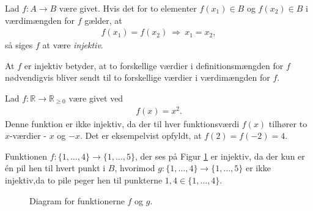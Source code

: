 \begin{defn}
	Lad $f:A \to B$ være givet. Hvis det for to elementer $f(x_1)\in B$ og $f(x_2)\in B$ i 		    værdimængden for $f$ gælder, at
	\begin{align*}
		f(x_1) = f(x_2) \ \Rightarrow \ x_1 = x_2,
	\end{align*}	 
	så siges $f$ at være \textit{injektiv}. 
\end{defn}
At $f$ er injektiv betyder, at to forskellige værdier i definitionsmængden for $f$ nødvendigvis bliver sendt til to forskellige værdier i værdimængden for $f$.
\begin{exa}
	Lad $f:\mathbb{R} \to \mathbb{R}_{\geq 0}$ være givet ved
	\begin{align*}
	f(x) = x^2.
	\end{align*}
	Denne funktion er ikke injektiv, da der til hver funktionsværdi $f(x)$ tilhører to $x$-værdier - $x$ og $-x$. Det er 	eksempelvist opfyldt, at $f(2) = f(-2) = 4$. 
\end{exa}
\begin{exa}
	Funktionen $f: \{1,\hdots,4\} \to \{1,\hdots, 5\}$, der ses på Figur \ref{fig:inj}
	 er injektiv,  da der kun er én pil hen til hvert
	punkt i $B$, hvorimod
	 $g:\{1,\hdots,4\} \to \{1,\hdots, 5\}$ er ikke injektiv,da to pile peger hen til punkterne $1,4\in \{1,\hdots,4\}$.
	\begin{figure}[H]
		\centering
		\caption{Diagram for funktionerne $f$ og $g$.}
		\label{fig:inj}
	\end{figure} 
\end{exa}

